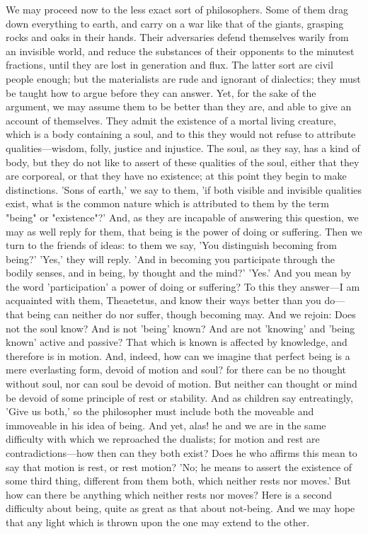 \documentclass[11pt,letter]{article}
\begin{document}
\par  We may proceed now to the less exact sort of philosophers. Some of them drag down everything to earth, and carry on a war like that of the giants, grasping rocks and oaks in their hands. Their adversaries defend themselves warily from an invisible world, and reduce the substances of their opponents to the minutest fractions, until they are lost in generation and flux. The latter sort are civil people enough; but the materialists are rude and ignorant of dialectics; they must be taught how to argue before they can answer. Yet, for the sake of the argument, we may assume them to be better than they are, and able to give an account of themselves. They admit the existence of a mortal living creature, which is a body containing a soul, and to this they would not refuse to attribute qualities—wisdom, folly, justice and injustice. The soul, as they say, has a kind of body, but they do not like to assert of these qualities of the soul, either that they are corporeal, or that they have no existence; at this point they begin to make distinctions. 'Sons of earth,' we say to them, 'if both visible and invisible qualities exist, what is the common nature which is attributed to them by the term "being" or "existence"?' And, as they are incapable of answering this question, we may as well reply for them, that being is the power of doing or suffering. Then we turn to the friends of ideas: to them we say, 'You distinguish becoming from being?' 'Yes,' they will reply. 'And in becoming you participate through the bodily senses, and in being, by thought and the mind?' 'Yes.' And you mean by the word 'participation' a power of doing or suffering? To this they answer—I am acquainted with them, Theaetetus, and know their ways better than you do—that being can neither do nor suffer, though becoming may. And we rejoin: Does not the soul know? And is not 'being' known? And are not 'knowing' and 'being known' active and passive? That which is known is affected by knowledge, and therefore is in motion. And, indeed, how can we imagine that perfect being is a mere everlasting form, devoid of motion and soul? for there can be no thought without soul, nor can soul be devoid of motion. But neither can thought or mind be devoid of some principle of rest or stability. And as children say entreatingly, 'Give us both,' so the philosopher must include both the moveable and immoveable in his idea of being. And yet, alas! he and we are in the same difficulty with which we reproached the dualists; for motion and rest are contradictions—how then can they both exist? Does he who affirms this mean to say that motion is rest, or rest motion? 'No; he means to assert the existence of some third thing, different from them both, which neither rests nor moves.' But how can there be anything which neither rests nor moves? Here is a second difficulty about being, quite as great as that about not-being. And we may hope that any light which is thrown upon the one may extend to the other.
\end{document}
